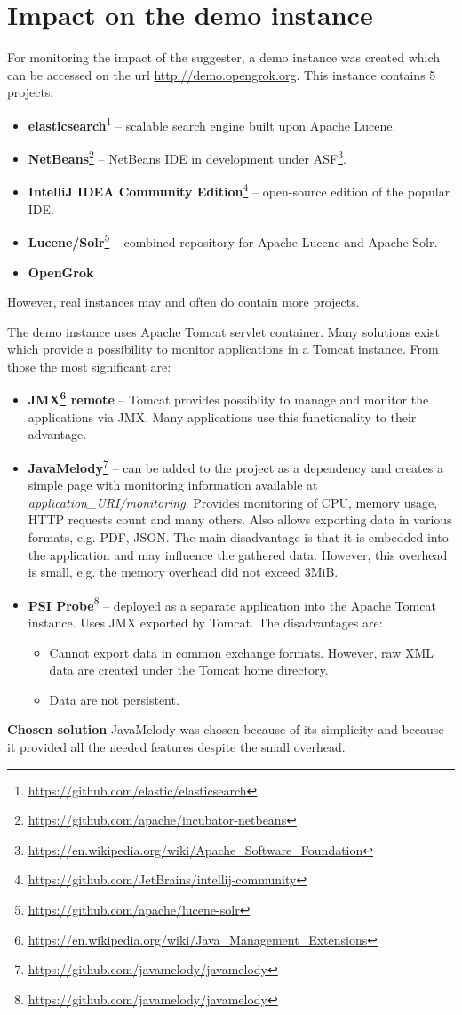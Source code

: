 \section{Impact on the demo instance}
For monitoring the impact of the suggester, a demo instance was created which can be accessed on the url
\url{http://demo.opengrok.org}. This instance contains 5 projects:
\begin{itemize}
    \item \textbf{elasticsearch}\footnote{\url{https://github.com/elastic/elasticsearch}} – scalable search engine built
    upon Apache Lucene.
    \item \textbf{NetBeans}\footnote{\url{https://github.com/apache/incubator-netbeans}} – NetBeans IDE in development
    under ASF\footnote{\url{https://en.wikipedia.org/wiki/Apache\_Software\_Foundation}}.
    \item \textbf{IntelliJ IDEA Community Edition}\footnote{\url{https://github.com/JetBrains/intellij-community}} –
    open-source edition of the popular IDE.
    \item \textbf{Lucene/Solr}\footnote{\url{https://github.com/apache/lucene-solr}} – combined repository for Apache
    Lucene and Apache Solr.
    \item \textbf{OpenGrok}
\end{itemize}
However, real instances may and often do contain more projects.

The demo instance uses Apache Tomcat servlet container. Many solutions exist which provide a possibility to monitor
applications in a Tomcat instance. From those the most significant are:
\begin{itemize}
    \item \textbf{JMX\footnote{\url{https://en.wikipedia.org/wiki/Java\_Management\_Extensions}} remote} –
    Tomcat provides possiblity to manage and monitor the applications via JMX. Many applications use this functionality
    to their advantage.
    \item \textbf{JavaMelody}\footnote{\url{https://github.com/javamelody/javamelody}} – can be added to the project as a
    dependency and creates a simple page with monitoring information available at \textit{application\_URI/monitoring}.
    Provides monitoring of CPU, memory usage, HTTP requests count and many others. Also allows exporting data in
    various formats, e.g. PDF, JSON. The main disadvantage is that it is embedded into the application and may influence
    the gathered data. However, this overhead is small, e.g. the memory overhead did not exceed 3MiB.
    \item \textbf{PSI Probe}\footnote{\url{https://github.com/javamelody/javamelody}} – deployed as a separate
    application into the Apache Tomcat instance. Uses JMX exported by Tomcat. The disadvantages are:
    \begin{itemize}
        \item Cannot export data in common exchange formats. However, raw XML data are created under the Tomcat
        home directory.
        \item Data are not persistent.
    \end{itemize}
\end{itemize}

\textbf{Chosen solution} JavaMelody was chosen because of its simplicity and because it provided all the needed
features despite the small overhead.
